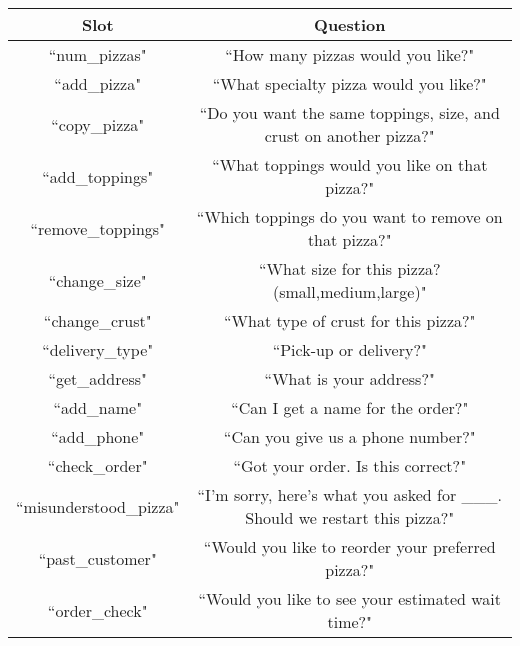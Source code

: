 \documentclass{article}
\begin{document}
\begin{tabular}{|c|c|}
\hline
Slot & Question \\\hline
``num\_pizzas" & ``How many pizzas would you like?"\\\hline
``add\_pizza" & ``What specialty pizza would you like?"\\\hline
``copy\_pizza" & ``Do you want the same toppings, size, and crust on another pizza?"\\\hline
``add\_toppings" & ``What toppings would you like on that pizza?"\\\hline
``remove\_toppings" & ``Which toppings do you want to remove on that pizza?"\\\hline
``change\_size" & ``What size for this pizza? (small,medium,large)"\\\hline
``change\_crust" & ``What type of crust for this pizza?"\\\hline
``delivery\_type" & ``Pick-up or delivery?"\\\hline
``get\_address" & ``What is your address?"\\\hline
``add\_name" & ``Can I get a name for the order?"\\\hline
``add\_phone" & ``Can you give us a phone number?"\\\hline
``check\_order" & ``Got your order. Is this correct?"\\\hline
``misunderstood\_pizza" & ``I'm sorry, here's what you asked for \_\_\_. Should we restart this pizza?"\\\hline
``past\_customer" & ``Would you like to reorder your preferred pizza?"\\\hline
``order\_check" & ``Would you like to see your estimated wait time?"\\\hline
\end{tabular}
\end{document}
